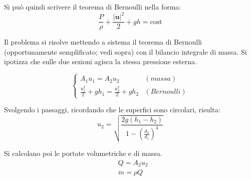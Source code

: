 Si può quindi scrivere il teorema di Bernoulli nella forma:
\begin{equation}
  \frac{P}{\rho} + \frac{|\bm{u}|^2}{2} + gh = \text{cost}
\end{equation}

\parttwo
 Il problema si risolve mettendo a sistema il teorema di Bernoulli (opportunamente
semplificato; vedi sopra) con il bilancio integrale di massa. Si ipotizza che sulle due sezioni agisca la stessa pressione esterna.

\begin{equation}
\begin{cases}
  A_1 u_1 = A_2 u_2 & (massa) \\
  \frac{u_1^2}{2} + g h_1 = \frac{u_2^2}{2} + g h_2 & (Bernoulli)
\end{cases}
\end{equation}

Svolgendo i passaggi, ricordando che le superfici sono circolari, risulta:
\begin{equation}
  u_2 = \sqrt{\frac{2 g (h_1-h_2)}{1-\displaystyle\left(\frac{d_2}{d_1}\right)^4}}
\end{equation}

Si calcolano poi le portate volumetriche e di massa.
\begin{equation}
\begin{aligned}
  & Q = A_2 u_2 \\
  & \dot{m} = \rho Q
\end{aligned}
\end{equation}
